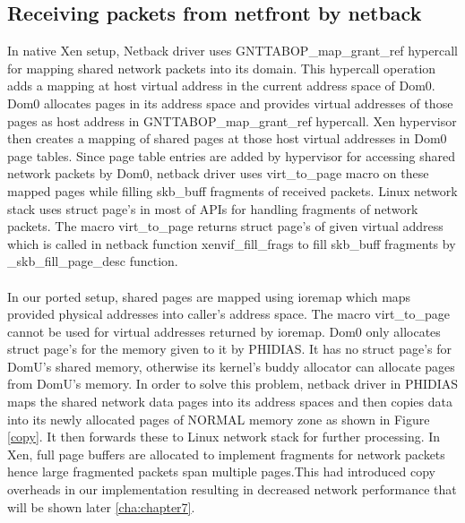 \subsection{Receiving packets from netfront by netback \label{sec:rxnetfront}}
In native Xen setup, Netback driver uses GNTTABOP\_map\_grant\_ref hypercall for mapping shared network packets into its domain. This hypercall operation adds a mapping at host virtual address in the current address space of Dom0. Dom0 allocates pages in its address space and provides virtual addresses of those pages as host address in  GNTTABOP\_map\_grant\_ref hypercall. Xen hypervisor then creates a mapping of shared pages at those host virtual addresses in Dom0 page tables. Since page table entries are added by hypervisor for accessing shared network packets by Dom0, netback driver uses virt\_to\_page macro on these mapped pages while filling skb\_buff fragments of received packets. Linux network stack uses struct page's in most of APIs for handling fragments of network packets. The macro virt\_to\_page returns struct page's of given virtual address which is called in netback function xenvif\_fill\_frags to fill skb\_buff fragments by \_skb\_fill\_page\_desc function.
\\
\\
In our ported setup, shared pages are mapped using ioremap which maps provided physical addresses into caller's address space. The macro virt\_to\_page cannot be used for virtual addresses returned by ioremap. Dom0 only allocates struct page's for the memory given to it by PHIDIAS. It has no struct page's for DomU's shared memory, otherwise its kernel's buddy allocator  \cite{buddy} can allocate pages from DomU's memory. In order to solve this problem, netback driver in PHIDIAS maps the shared network data pages into its address spaces and then copies data into its newly allocated pages of NORMAL memory zone as shown in Figure \ref{copy}. It then forwards these to Linux network stack for further processing. In Xen, full page buffers are allocated to implement fragments for network packets hence large fragmented packets span multiple pages.This had introduced copy overheads in our implementation resulting in decreased network performance that will be shown later \ref{cha:chapter7}.

